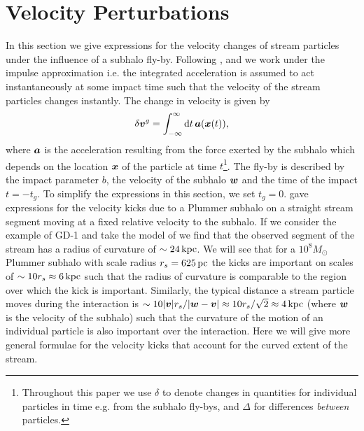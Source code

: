 \documentclass[useAMS,usenatbib,fleqn,a4paper]{mn2e}
\def\d{{\rm d}}
\def\kpc{\,{\rm kpc}}
\def\pc{\,{\rm pc}}
\newcommand{\bs}[1]{\bmath{#1}}
\begin{document}
\section{Velocity Perturbations}\label{Sect::Formalism}
In this section we give expressions for the velocity changes of stream particles under the influence of a subhalo fly-by. Following \cite{YoonJohnstonHogg}, \cite{Carlberg2013} and \cite{ErkalBelokurov2015} we work under the impulse approximation i.e. the integrated acceleration is assumed to act instantaneously at some impact time such that the velocity of the stream particles changes instantly. The change in velocity is given by
\begin{equation}
\delta\bs{v}^g = \int_{-\infty}^{\infty} \d t\,\bs{a}(\bs{x}(t)),
\end{equation}
where $\bs{a}$ is the acceleration resulting from the force exerted by the subhalo which depends on the location $\bs{x}$ of the particle at time $t$\footnote{Throughout this paper we use $\delta$ to denote changes in quantities for individual particles in time e.g. from the subhalo fly-bys, and $\Delta$ for differences \emph{between} particles.}. The fly-by is described by the impact parameter $b$, the velocity of the subhalo $\bs{w}$ and the time of the impact $t=-t_g$. To simplify the expressions in this section, we set $t_g=0$. \cite{ErkalBelokurov2015} gave expressions for the velocity kicks due to a Plummer subhalo on a straight stream segment moving at a fixed relative velocity to the subhalo. If we consider the example of GD-1 and take the model of \cite{Koposov2010} we find that the observed segment of the stream has a radius of curvature of $\sim24\kpc$. We will see that for a $10^8M_\odot$ Plummer subhalo with scale radius $r_s=625\pc$ the kicks are important on scales of $\sim10r_s\approx6\kpc$ such that the radius of curvature is comparable to the region over which the kick is important. Similarly, the typical distance a stream particle moves during the interaction is $\sim10|\bs{v}|r_s/|\bs{w}-\bs{v}|\approx10r_s/\sqrt{2}\approx4\kpc$ (where $\bs{w}$ is the velocity of the subhalo) such that the curvature of the motion of an individual particle is also important over the interaction. Here we will give more general formulae for the velocity kicks that account for the curved extent of the stream.
\end{document}
